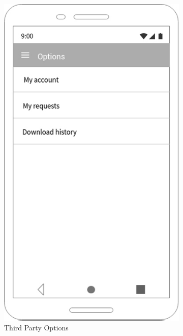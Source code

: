 \begin{figure}[h!]

 \centering

  \begin{subfigure}[b]{0.25\linewidth}

    \includegraphics[width=\linewidth]{img/mockup/tp_options.jpg}

    \caption{Third Party Options}

  \end{subfigure}
 ~ ~ ~ ~ ~ ~ 
  \begin{subfigure}[b]{0.25\linewidth}


\end{subfigure}
\end{figure}
